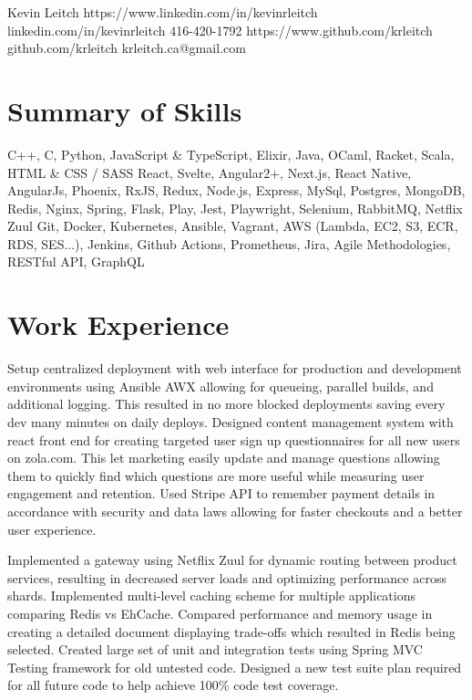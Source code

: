\documentclass{my_resume}
\begin{document}

\myhead
{Kevin Leitch}
{https://www.linkedin.com/in/kevinrleitch}
{linkedin.com/in/kevinrleitch}
{416-420-1792}
{https://www.github.com/krleitch}
{github.com/krleitch}
{krleitch.ca@gmail.com}

\section{Summary of Skills}
{C++, C, Python, JavaScript \& TypeScript, Elixir, Java, OCaml, Racket, Scala, HTML \& CSS / SASS}
{React, Svelte, Angular2+, Next.js, React Native, AngularJs, Phoenix, RxJS, Redux, Node.js, Express, MySql, Postgres,
 MongoDB, Redis, Nginx, Spring, Flask, Play, Jest, Playwright, Selenium, RabbitMQ, Netflix Zuul}
{Git, Docker, Kubernetes, Ansible, Vagrant, AWS (Lambda, EC2, S3, ECR, RDS, SES...),
 Jenkins, Github Actions, Prometheus, Jira, Agile Methodologies, RESTful API, GraphQL}

\section{Work Experience}

\workitemsthree
{Setup centralized deployment with web interface for production and development environments using Ansible AWX allowing for queueing, parallel builds, and additional logging. This resulted in no more blocked deployments saving every dev many minutes on daily deploys.}
{Designed content management system with react front end for creating targeted user sign up questionnaires for all new users on zola.com. This let marketing easily update and manage questions allowing them to quickly find which questions are more useful while measuring user engagement and retention.}
{Used Stripe API to remember payment details in accordance with security and data laws allowing for faster checkouts and a better user experience.}

\workitemsthree
{Implemented a gateway using Netflix Zuul for dynamic routing between product services,
 resulting in decreased server loads and optimizing performance across shards.}
{Implemented multi-level caching scheme for multiple applications comparing Redis vs EhCache. Compared performance and memory usage in creating a detailed document displaying trade-offs which resulted in Redis being selected.}
{Created large set of unit and integration tests using Spring MVC Testing framework for old untested code.
 Designed a new test suite plan required for all future code to help achieve 100\% code test coverage.}
\end{document}
